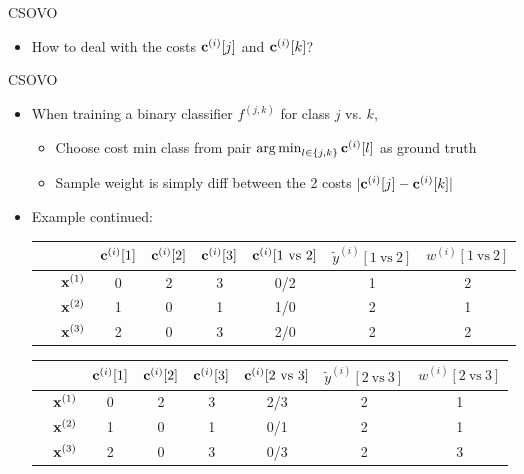 \documentclass[11pt,compress,t,notes=noshow, xcolor=table]{beamer}
\begin{document}
\begin{vbframe}{CSOVO \href{https://proceedings.mlr.press/v39/lin14.pdf}{}}
\begin{itemize}
\begin{itemize}
            \item How to deal with the costs $\mathbf{c}^{(i)}[j]$ and $\mathbf{c}^{(i)}[k]$?
            
        \end{itemize}
            
    \end{itemize}

\end{vbframe}


\begin{vbframe}{CSOVO}
    \begin{itemize}
        \item When training a binary classifier $f^{(j, k)}$ for class $j$ vs. $k$,
        \begin{itemize}
            \item Choose cost min class from pair $\operatorname{arg\,min}_{l \in \{j, k\}} \mathbf{c}^{(i)}[l]$ as ground truth 
            
            \item Sample weight is simply diff between the 2 costs      $|\mathbf{c}^{(i)}[j] - \mathbf{c}^{(i)}[k]|$

        \end{itemize}
        
        \item Example continued:
\begin{center}
    \footnotesize
                            \begin{tabular}{cc|ccc|ccc}\
        			& & $\mathbf{c}^{(i)}[1]$ & $\mathbf{c}^{(i)}[2]$ & $\mathbf{c}^{(i)}[3]$ & $\cv^{(i)}[1 \ \text{vs} \ 2]$ & $\tilde{y}^{( i)}[1 \ \text{vs} \ 2]$ & $w^{(i)}[1 \ \text{vs} \ 2]$\\
        			\hline & $\mathbf{x}^{(1)}$ & 0 & 2 & 3 & 0/2 & 1 & 2\\
        			& $\mathbf{x}^{(2)}$ & 1 & 0 & 1 & 1/0 & 2 & 1 \\
                 	& $\mathbf{x}^{(3)}$ & 2 & 0 & 3 & 2/0 & 2 & 2\\
                \end{tabular}

                \begin{tabular}{cc|ccc|ccc}
        			& & $\mathbf{c}^{(i)}[1]$ & $\mathbf{c}^{(i)}[2]$ & $\mathbf{c}^{(i)}[3]$ & $\cv^{(i)}[2 \ \text{vs} \ 3]$ & $\tilde{y}^{( i)}[2 \ \text{vs} \ 3]$ & $w^{(i)}[2 \ \text{vs} \ 3]$\\
        			\hline & $\mathbf{x}^{(1)}$ & 0 & 2 & 3 & 2/3 & 2 & 1\\
        			& $\mathbf{x}^{(2)}$ & 1 & 0 & 1 & 0/1 & 2 & 1\\
                 	& $\mathbf{x}^{(3)}$ & 2 & 0 & 3 & 0/3 & 2 & 3\\
                \end{tabular}
\end{center}


\end{itemize}
\end{vbframe}
\end{document}
